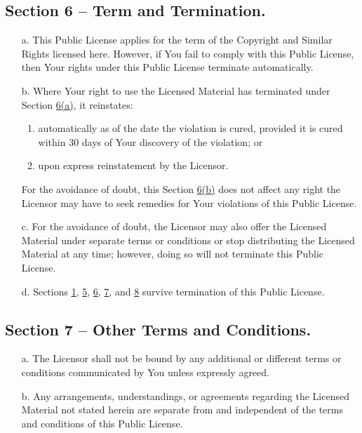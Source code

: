 \subsection*{Section 6 – Term and Termination.}
\begin{itemize}
\item[a.] This Public License applies for the term of the Copyright and Similar Rights licensed here. However, if You fail to comply with this Public License, then Your rights under this Public License terminate automatically.
\item[b.] Where Your right to use the Licensed Material has terminated under Section \href{https://creativecommons.org/licenses/by-nc-nd/4.0/legalcode#s6a}{6(a)}, it reinstates:
	\begin{enumerate}
	\item automatically as of the date the violation is cured, provided it is cured within 30 days of Your discovery of the violation; or
	\item upon express reinstatement by the Licensor.
	\end{enumerate}
For the avoidance of doubt, this Section \href{https://creativecommons.org/licenses/by-nc-nd/4.0/legalcode#s6b}{6(b)} does not affect any right the Licensor may have to seek remedies for Your violations of this Public License.
\item[c.] For the avoidance of doubt, the Licensor may also offer the Licensed Material under separate terms or conditions or stop distributing the Licensed Material at any time; however, doing so will not terminate this Public License.
\item[d.] Sections \href{https://creativecommons.org/licenses/by-nc-nd/4.0/legalcode#s1}{1}, \href{https://creativecommons.org/licenses/by-nc-nd/4.0/legalcode#s5}{5}, \href{https://creativecommons.org/licenses/by-nc-nd/4.0/legalcode#s6}{6}, \href{https://creativecommons.org/licenses/by-nc-nd/4.0/legalcode#s7}{7}, and \href{https://creativecommons.org/licenses/by-nc-nd/4.0/legalcode#s8}{8} survive termination of this Public License.
\end{itemize}

\subsection*{Section 7 – Other Terms and Conditions.}
\begin{itemize}
\item[a.] The Licensor shall not be bound by any additional or different terms or conditions communicated by You unless expressly agreed.
\item[b.] Any arrangements, understandings, or agreements regarding the Licensed Material not stated herein are separate from and independent of the terms and conditions of this Public License.
\end{itemize}


